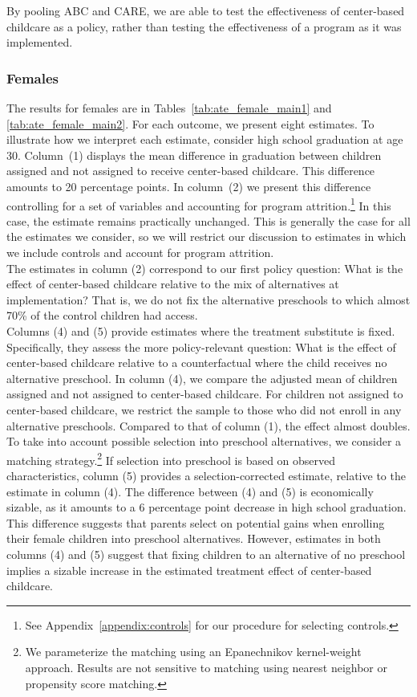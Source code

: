 \noindent By pooling ABC and CARE, we are able to test the effectiveness of center-based childcare as a policy, rather than testing the effectiveness of a program as it was implemented.\\

\subsubsection{Females} \label{section:centerfemales}

\noindent The results for females are in Tables~\ref{tab:ate_female_main1} and \ref{tab:ate_female_main2}. For each outcome, we present eight estimates. To illustrate how we interpret each estimate, consider high school graduation at age 30. Column~(1) displays the mean difference in graduation between children assigned and not assigned to receive center-based childcare. This difference amounts to 20 percentage points. In column~(2) we present this difference controlling for a set of variables and accounting for program attrition.\footnote{See Appendix~\ref{appendix:controls} for our procedure for selecting controls.} In this case, the estimate remains practically unchanged. This is generally the case for all the estimates we consider, so we will restrict our discussion to estimates in which we include controls and account for program attrition.\\

\noindent The estimates in column (2) correspond to our first policy question: What is the effect of center-based childcare relative to the mix of alternatives at implementation? That is, we do not fix the alternative preschools to which almost 70\% of the control children had access.\\

\noindent Columns (4) and (5) provide estimates where the treatment substitute is fixed. Specifically, they assess the more policy-relevant question: What is the effect of center-based childcare relative to a counterfactual where the child receives no alternative preschool. In column (4), we compare the adjusted mean of children assigned and not assigned to center-based childcare. For children not assigned to center-based childcare, we restrict the sample to those who did not enroll in any alternative preschools. Compared to that of column (1), the effect almost doubles. To take into account possible selection into preschool alternatives, we consider a matching strategy.\footnote{We parameterize the matching using an Epanechnikov kernel-weight approach. Results are not sensitive to matching using nearest neighbor or propensity score matching.} If selection into preschool is based on observed characteristics, column (5) provides a selection-corrected estimate, relative to the estimate in column (4). The difference between (4) and (5) is economically sizable, as it amounts to a 6 percentage point decrease in high school graduation. This difference suggests that parents select on potential gains when enrolling their female children into preschool alternatives. However, estimates in both columns (4) and (5) suggest that fixing children to an alternative of no preschool implies a sizable increase in the estimated treatment effect of center-based childcare. \\

